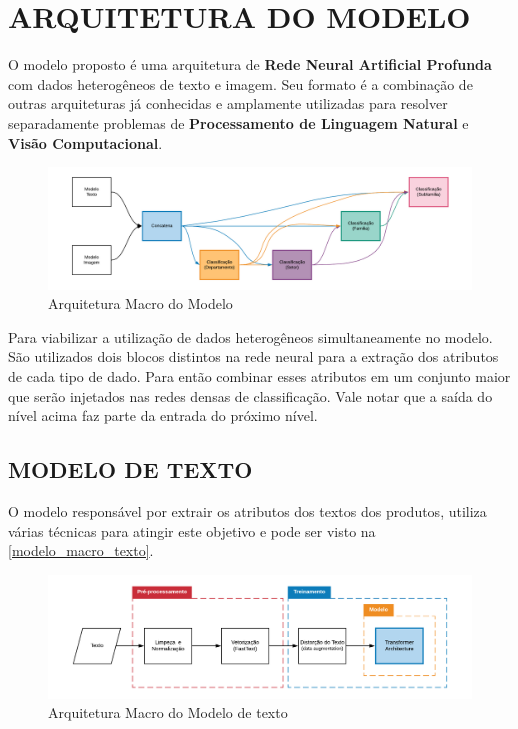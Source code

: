 \chapter{ARQUITETURA DO MODELO}

O modelo proposto é uma arquitetura de \textbf{Rede Neural Artificial Profunda} com dados heterogêneos de texto e imagem. Seu formato é a combinação de outras arquiteturas já conhecidas e amplamente utilizadas para resolver separadamente problemas de \textbf{Processamento de Linguagem Natural} e \textbf{Visão Computacional}. 

\begin{figure}[htb]
	\caption{\label{arquitetura_macro_do_modelo} Arquitetura Macro do Modelo}
	\begin{center}
	    \includegraphics[width=\textwidth]{artigo/recursos/imagens/arquitetura_macro_do_modelo.png}
	\end{center}
\end{figure}

Para viabilizar a utilização de dados heterogêneos simultaneamente no modelo. São utilizados dois blocos distintos na rede neural para a extração dos atributos de cada tipo de dado. Para então combinar esses atributos em um conjunto maior que serão injetados nas redes densas de classificação. Vale notar que a saída do nível acima faz parte da entrada do próximo nível.

\section{MODELO DE TEXTO}

O modelo responsável por extrair os atributos dos textos dos produtos, utiliza várias técnicas para atingir este objetivo e pode ser visto na \autoref{modelo_macro_texto}.

\begin{figure}[htb]
	\caption{\label{modelo_macro_texto} Arquitetura Macro do Modelo de texto}
	\begin{center}
	    \includegraphics[width=\textwidth]{artigo/recursos/imagens/modelo_macro_texto.png}
	\end{center}
\end{figure}

